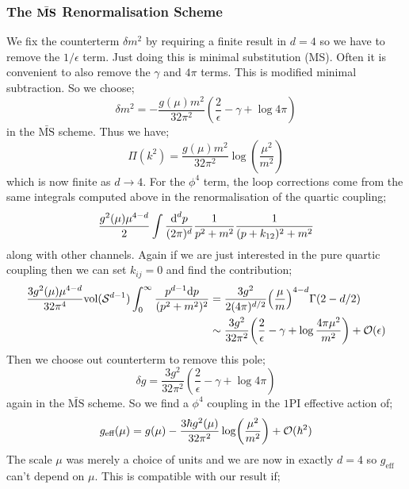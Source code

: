 \subsubsection{The $\bar{\text{\textbf{MS}}}$ Renormalisation Scheme}
We fix the counterterm $\delta m^2$ by requiring a finite result in $d = 4$ so we have to remove the $1/\epsilon$ term. Just doing this is minimal substitution (MS). Often it is convenient to also remove the $\gamma$ and $4\pi$ terms. This is modified minimal subtraction. So we choose;
\begin{equation*}
\delta m^2 = - \frac{g(\mu)m^2}{32\pi^2}\left(\frac{2}{\epsilon} - \gamma + \log 4\pi\right)
\end{equation*}
in the $\bar{\text{MS}}$ scheme. Thus we have;
\begin{equation*}
\Pi(k^2) = \frac{g(\mu)m^2}{32\pi^2}\log\left(\frac{\mu^2}{m^2}\right)
\end{equation*}
which is now finite as $d \rightarrow 4$. For the $\phi^4$ term, the loop corrections come from the same integrals computed above in the renormalisation of the quartic coupling;
\begin{equation*}
\frac{g^{2}(\mu)\mu^{4 - d}}{2}\int{\frac{\text{d}^{d}p}{(2\pi)^{d}}\frac{1}{p^2 + m^2}\frac{1}{(p + k_{12})^2 + m^2}}
\end{equation*}
along with other channels. Again if we are just interested in the pure quartic coupling then we can set $k_{ij} = 0$ and find the contribution;
\begin{align*}
\frac{3g^{2}(\mu)\mu^{4 - d}}{32\pi^4}\text{vol}(\mS^{d - 1})\int_0^{\infty}{\frac{p^{d - 1}\ud p}{(p^2 + m^2)^2}} &= \frac{3g^2}{2(4 \pi)^{d/2}}\left(\frac{\mu}{m}\right)^{4 - d}\Gamma(2 - d/2) \\
&\sim \frac{3g^2}{32\pi^2}\left(\frac{2}{\epsilon} - \gamma + \log\frac{4\pi \mu^2}{m^2}\right) + \mO(\epsilon) 
\end{align*}
Then we choose out counterterm to remove this pole;
\begin{equation}
\delta g = \frac{3g^2}{32\pi^2}\left(\frac{2}{\epsilon} - \gamma + \log 4\pi\right)
\end{equation}
again in the $\bar{\text{MS}}$ scheme. So we find a $\phi^{4}$ coupling in the $1$PI effective action of;
\begin{equation*}
g_{\text{eff}}(\mu) = g(\mu) - \frac{3\hbar g^{2}(\mu)}{32\pi^2}\log\left(\frac{\mu^2}{m^2}\right) + \mO(\hbar^2)
\end{equation*}
The scale $\mu$ was merely a choice of units and we are now in exactly $d = 4$ so $g_{\text{eff}}$ can't depend on $\mu$. This is compatible with our result if;
